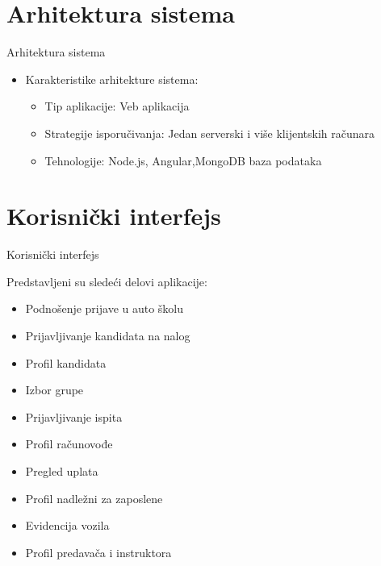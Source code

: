 \documentclass[compress, containsverbatim,mathserif, xcolor=dvipsnames, unicode]{beamer}
\begin{document}
\section{Arhitektura sistema}
\begin{frame}{Arhitektura sistema}
\vspace{\baselineskip}
\begin{itemize}
	\item Karakteristike arhitekture sistema:
    \begin{itemize}
        \item Tip aplikacije: Veb aplikacija
        \item Strategije isporučivanja: Jedan serverski i više klijentskih računara
        \item Tehnologije: Node.js, Angular,MongoDB baza podataka
    \end{itemize}
   

\end{itemize}
\end{frame}


\section{Korisnički interfejs}
\begin{frame}{Korisnički interfejs}
\vspace{\baselineskip}

	Predstavljeni su sledeći delovi aplikacije:
    \begin{itemize}
        \item Podnošenje prijave u auto školu
        \item Prijavljivanje kandidata na nalog
        \item Profil kandidata
        \item Izbor grupe
        \item Prijavljivanje ispita
        \item Profil računovođe
        \item Pregled uplata
        \item Profil nadležni za zaposlene
        \item Evidencija vozila
        \item Profil predavača i instruktora
   
    \end{itemize}
\end{frame}
\end{document}
